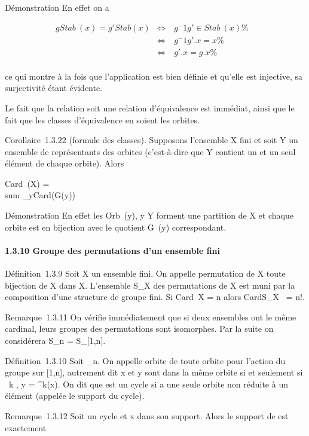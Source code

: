 Démonstration En effet on a

\begin{align*} gStab~(x) =
g'Stab(x)& \mathrel\Leftrightarrow~ &
g^-1g' \in Stab~(x)\%&
\\ & \Leftrightarrow &
g^-1g'.x = x \%& \\ &
\Leftrightarrow & g'.x = g.x \%&
\\ \end{align*}

ce qui montre à la fois que l'application est bien définie et qu'elle
est injective, sa surjectivité étant évidente.

Le fait que la relation soit une relation d'équivalence est immédiat,
ainsi que le fait que les classes d'équivalence en soient les orbites.

Corollaire~1.3.22 (formule des classes). Supposons l'ensemble X fini et
soit Y un ensemble de représentants des orbites (c'est-à-dire que Y
contient un et un seul élément de chaque orbite). Alors

Card~(X) = \\sum
_y\inY  Card(G\diagupStab(y))

Démonstration En effet les Orb~(y), y \in Y
forment une partition de X et chaque orbite est en bijection avec le
quotient G\diagupStab~(y) correspondant.

\paragraph{1.3.10 Groupe des permutations d'un ensemble fini}

Définition~1.3.9 Soit X un ensemble fini. On appelle permutation de X
toute bijection de X dans X. L'ensemble S_X des permutations de
X est muni par la composition d'une structure de groupe fini. Si
Card~X = n alors
CardS_X~ = n!.

Remarque~1.3.11 On vérifie immédiatement que si deux ensembles ont le
même cardinal, leurs groupes des permutations sont isomorphes. Par la
suite on considérera S_n = S_[1,n].

Définition~1.3.10 Soit \sigma \inS_n. On appelle orbite de \sigma toute
orbite pour l'action du groupe \langle
\sigma\rangle sur [1,n], autrement dit x et y sont dans la
même orbite si et seulement si \exists~k \in {}, y =
\sigma^k(x). On dit que \sigma est un cycle si \sigma a une seule orbite non
réduite à un élément (appelée le support du cycle).

Remarque~1.3.12 Soit \sigma un cycle et x dans son support. Alors le support
de \sigma est exactement

